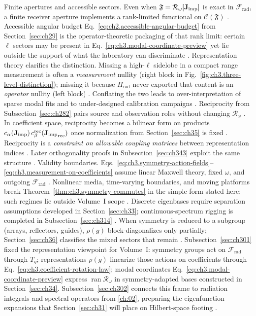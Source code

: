 Finite apertures and accessible sectors. Even when \(\mathfrak{F}=\mathcal{R}_\omega[\mathbf{J}_{\mathrm{imp}}]\) is exact in \(\mathcal{F}_{\mathrm{rad}}\), a finite receiver aperture implements a rank-limited functional on \(\mathcal{C}(\mathfrak{F})\) . Accessible angular budget Eq.~\eqref{eq:ch2.accessible-angular-budget} from Section~\ref{sec:ch29} is the operator-theoretic packaging of that rank limit: certain \(\ell\) sectors may be present in Eq.~\eqref{eq:ch3.modal-coordinate-preview} yet lie outside the support of what the laboratory can discriminate . Representation theory clarifies the distinction. Missing a high-\(\ell\) sidelobe in a compact range measurement is often a \emph{measurement} nullity (right block in Fig.~\ref{fig:ch3.three-level-distinction}); missing it because \(\Pi_{\mathrm{rad}}\) never exported that content is an \emph{operator} nullity (left block) . Conflating the two leads to over-interpretation of sparse modal fits and to under-designed calibration campaigns .
Reciprocity from Subsection~\ref{sec:ch282} pairs source and observation roles without changing \(\mathcal{R}_\omega\) . In coefficient space, reciprocity becomes a bilinear form on products \(c_\alpha(\mathbf{J}_{\mathrm{imp}})\,c_\beta^{\mathrm{rec}}({\mathbf{J}_{\mathrm{imp}}}_{\mathrm{rec}})\) once normalization from Section~\ref{sec:ch35} is fixed . Reciprocity is a \emph{constraint on allowable coupling matrices} between representation indices . Later orthogonality proofs in Subsection~\ref{sec:ch343} exploit the same structure .
Validity boundaries. Eqs.~\eqref{eq:ch3.symmetry-action-fields}--\eqref{eq:ch3.measurement-on-coefficients} assume linear Maxwell theory, fixed \(\omega\), and outgoing \(\mathcal{F}_{\mathrm{rad}}\) . Nonlinear media, time-varying boundaries, and moving platforms break Theorem~\ref{thm:ch3.symmetry-commutes} in the simple form stated here; such regimes lie outside Volume~I scope . Discrete eigenbases require separation assumptions developed in Section~\ref{sec:ch33}; continuous-spectrum rigging is completed in Subsection~\ref{sec:ch314} . When symmetry is reduced to a subgroup (arrays, reflectors, guides), \(\rho(g)\) block-diagonalizes only partially; Section~\ref{sec:ch36} classifies the mixed sectors that remain .
Subsection~\ref{sec:ch301} fixed the representation viewpoint for Volume~I: symmetry groups act on \(\mathcal{F}_{\mathrm{rad}}\) through \(T_g\); representations \(\rho(g)\) linearize those actions on coefficients through Eq.~\eqref{eq:ch3.coefficient-rotation-law}; modal coordinates Eq.~\eqref{eq:ch3.modal-coordinate-preview} express \(\operatorname{ran}\mathcal{R}_\omega\) in symmetry-adapted bases constructed in Section~\ref{sec:ch34}. Subsection~\ref{sec:ch302} connects this frame to radiation integrals and spectral operators from \ref{ch:02}, preparing the eigenfunction expansions that Section~\ref{sec:ch31} will place on Hilbert-space footing .
